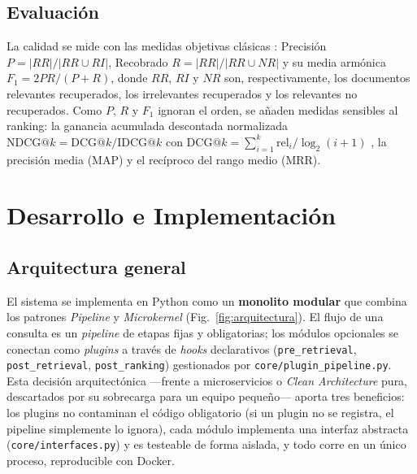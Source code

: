 \documentclass[runningheads,a4paper,14pts]{llncs}
\begin{document}
	\subsection{Evaluación}
	
	La calidad se mide con las medidas objetivas clásicas \cite{manning2008}:
	Precisión $P=|RR|/|RR\cup RI|$, Recobrado $R=|RR|/|RR\cup NR|$ y su media
	armónica $F_1=2PR/(P+R)$, donde $RR$, $RI$ y $NR$ son, respectivamente, los
	documentos relevantes recuperados, los irrelevantes recuperados y los relevantes
	no recuperados. Como $P$, $R$ y $F_1$ ignoran el orden, se añaden medidas
	sensibles al ranking: la ganancia acumulada descontada normalizada
	$\mathrm{NDCG}@k=\mathrm{DCG}@k/\mathrm{IDCG}@k$ con
	$\mathrm{DCG}@k=\sum_{i=1}^{k} \mathrm{rel}_i/\log_2(i+1)$
	\cite{jarvelin2002}, la precisión media (MAP) y el recíproco del rango medio
	(MRR).
	
	\section{Desarrollo e Implementación}\label{sec:desarrollo}
	
	\subsection{Arquitectura general}
	
	El sistema se implementa en Python como un \textbf{monolito modular} que
	combina los patrones \emph{Pipeline} y \emph{Microkernel}
	(Fig.~\ref{fig:arquitectura}). El flujo de una consulta es un \emph{pipeline} de
	etapas fijas y obligatorias; los módulos opcionales se conectan como
	\emph{plugins} a través de \emph{hooks} declarativos (\texttt{pre\_retrieval},
	\texttt{post\_retrieval}, \texttt{post\_ranking}) gestionados por
	\texttt{core/plugin\_pipeline.py}. Esta decisión arquitectónica ---frente a
	microservicios o \emph{Clean Architecture} pura, descartados por su sobrecarga
	para un equipo pequeño--- aporta tres beneficios: los plugins no contaminan el
	código obligatorio (si un plugin no se registra, el pipeline simplemente lo
	ignora), cada módulo implementa una interfaz abstracta (\texttt{core/interfaces.py})
	y es testeable de forma aislada, y todo corre en un único proceso, reproducible
	con Docker.
	
\end{document}
